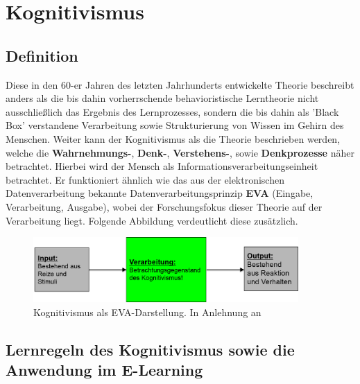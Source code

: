 \chapter{Kognitivismus}
\label{cha:Kognitivismus}

\section{Definition}\label{Definition Kognitivismus}

Diese in den 60-er Jahren des letzten Jahrhunderts entwickelte Theorie beschreibt anders als die bis dahin vorherrschende behavioristische Lerntheorie nicht ausschließlich das Ergebnis des Lernprozesses, sondern die bis dahin als 'Black Box' verstandene Verarbeitung sowie Strukturierung von Wissen im Gehirn des Menschen. \cite[S. 155]{Erpenbeck.2007} 
Weiter kann der Kognitivismus als die Theorie beschrieben werden, welche die \textbf{Wahrnehmungs-}, \textbf{Denk-}, \textbf{Verstehens-}, sowie \textbf{Denkprozesse} näher betrachtet. Hierbei wird der Mensch als Informationsverarbeitungseinheit betrachtet. Er funktioniert ähnlich wie das aus der elektronischen Datenverarbeitung bekannte Datenverarbeitungsprinzip \textbf{EVA} (Eingabe, Verarbeitung, Ausgabe), wobei der Forschungsfokus dieser Theorie auf der Verarbeitung liegt. Folgende Abbildung verdeutlicht diese zusätzlich. \cite{AnsgarA.PlassmannProf.Dr.GunterSchmitt.2007}

\begin{figure}[h]
	\centering
	\includegraphics[width=0.9\textwidth]{Abbildungen/Kognitivismus1.PNG}
	\caption{Kognitivismus als EVA-Darstellung. In Anlehnung an \cite[S. 12]{SusanneMeir.}}
	\label{fig:Kerres2001_Kopiermodell}
\end{figure}

\section{Lernregeln des Kognitivismus sowie die Anwendung im E-Learning}

